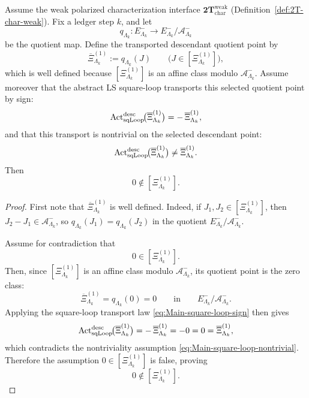 \begin{theorem}
\label{thm:Main-nonvanishing-from-square-loop}
Assume the weak polarized characterization interface
\(\mathbf{2T}_{\mathrm{char}}^{\mathrm{weak}}\)
\textnormal{(Definition~\ref{def:2T-char-weak})}. Fix a ledger step \(k\), and let
\[
q_{\Lambda_k}:E^-_{\Lambda_k}\longrightarrow E^-_{\Lambda_k}/\mathcal A^-_{\Lambda_k}
\]
be the quotient map.
Define the transported descendant quotient point by
\[
\overline{\Xi}^{(1)}_{\Lambda_k}
:=
q_{\Lambda_k}(J)
\qquad
\bigl(J\in[\Xi^{(1)}_{\Lambda_k}]\bigr),
\]
which is well defined because \([\Xi^{(1)}_{\Lambda_k}]\) is an affine class modulo
\(\mathcal A^-_{\Lambda_k}\).
Assume moreover that the abstract LS square-loop transports this selected quotient point by sign:
\begin{equation}
\mathrm{Act}^{\mathrm{desc}}_{\mathrm{sqLoop}}\!\big(\overline{\Xi}^{(1)}_{\Lambda_k}\big)
=
-\,\overline{\Xi}^{(1)}_{\Lambda_k},
\label{eq:Main-square-loop-sign}
\end{equation}
and that this transport is nontrivial on the selected descendant point:
\begin{equation}
\mathrm{Act}^{\mathrm{desc}}_{\mathrm{sqLoop}}\!\big(\overline{\Xi}^{(1)}_{\Lambda_k}\big)
\neq
\overline{\Xi}^{(1)}_{\Lambda_k}.
\label{eq:Main-square-loop-nontrivial}
\end{equation}
Then
\[
0\notin[\Xi^{(1)}_{\Lambda_k}].
\]
\end{theorem}

\begin{proof}
First note that \(\overline{\Xi}^{(1)}_{\Lambda_k}\) is well defined.
Indeed, if \(J_1,J_2\in[\Xi^{(1)}_{\Lambda_k}]\), then
\(
J_2-J_1\in\mathcal A^-_{\Lambda_k}
\),
so
\(
q_{\Lambda_k}(J_1)=q_{\Lambda_k}(J_2)
\)
in the quotient \(E^-_{\Lambda_k}/\mathcal A^-_{\Lambda_k}\).

Assume for contradiction that
\[
0\in[\Xi^{(1)}_{\Lambda_k}].
\]
Then, since \([\Xi^{(1)}_{\Lambda_k}]\) is an affine class modulo \(\mathcal A^-_{\Lambda_k}\), its
quotient point is the zero class:
\[
\overline{\Xi}^{(1)}_{\Lambda_k}
=
q_{\Lambda_k}(0)
=
0
\qquad\text{in}\qquad
E^-_{\Lambda_k}/\mathcal A^-_{\Lambda_k}.
\]
Applying the square-loop transport law \eqref{eq:Main-square-loop-sign} then gives
\[
\mathrm{Act}^{\mathrm{desc}}_{\mathrm{sqLoop}}\!\big(\overline{\Xi}^{(1)}_{\Lambda_k}\big)
=
-\,\overline{\Xi}^{(1)}_{\Lambda_k}
=
-0
=
0
=
\overline{\Xi}^{(1)}_{\Lambda_k},
\]
which contradicts the nontriviality assumption \eqref{eq:Main-square-loop-nontrivial}.
Therefore the assumption \(0\in[\Xi^{(1)}_{\Lambda_k}]\) is false, proving
\[
0\notin[\Xi^{(1)}_{\Lambda_k}].
\]

\end{proof}


